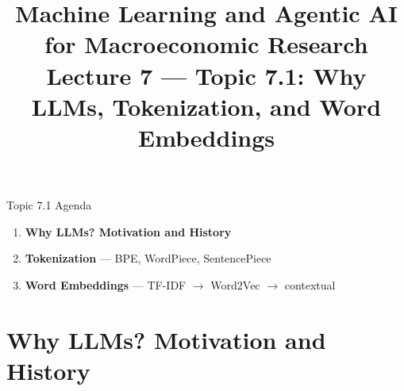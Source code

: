 


\graphicspath{{./pic/}{../../MiniCourse_8hr/Slides/Module3_LLM_Text/pic/}{../}}

\title[AI \& ML for Quant Macro]{Machine Learning and Agentic AI for Macroeconomic Research\\
Lecture 7 --- Topic 7.1: Why LLMs, Tokenization, and Word Embeddings}



\makebeamertitle

\begin{frame}{Topic 7.1 Agenda}
\begin{enumerate}
  \item \textbf{Why LLMs? Motivation and History}
  \medskip
  \item \textbf{Tokenization} --- BPE, WordPiece, SentencePiece
  \medskip
  \item \textbf{Word Embeddings} --- TF-IDF $\to$ Word2Vec $\to$ contextual
\end{enumerate}
\end{frame}

\section{Why LLMs? Motivation and History}

